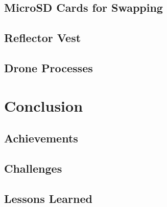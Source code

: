 \documentclass[a4paper,12pt,twoside]{article}
\begin{document}
\begin{multicols}{2}
\lipsum[0-5]
\end{multicols}

\subsection{MicroSD Cards for Swapping}

\begin{multicols}{2}
\lipsum[0-5]
\end{multicols}

\subsection{Reflector Vest}

\begin{multicols}{2}
\lipsum[0-5]
\end{multicols}

\subsection{Drone Processes}

\begin{multicols}{2}
\lipsum[0-5]
\end{multicols}

\section{Conclusion}

\begin{multicols}{2}
\lipsum[0-5]
\end{multicols}

\subsection{Achievements}

\begin{multicols}{2}
\lipsum[0-5]
\end{multicols}

\subsection{Challenges}

\begin{multicols}{2}
\lipsum[0-5]
\end{multicols}

\subsection{Lessons Learned}
\end{document}
